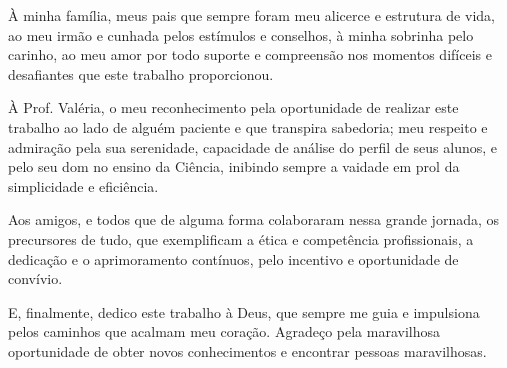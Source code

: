 
À minha família, meus pais que sempre foram meu alicerce e estrutura de vida, ao meu irmão e cunhada pelos estímulos e conselhos, à minha sobrinha pelo carinho, ao meu amor por todo suporte e compreensão nos momentos difíceis e desafiantes que este trabalho proporcionou.

À Prof. Valéria, o meu reconhecimento pela oportunidade de realizar este trabalho ao lado de alguém paciente e que transpira sabedoria; meu respeito e admiração pela sua serenidade, capacidade de análise do perfil de seus alunos, e pelo seu dom no ensino da Ciência, inibindo sempre a vaidade em prol da simplicidade e eficiência.

Aos amigos, e todos que de alguma forma colaboraram nessa grande jornada, os precursores de tudo, que exemplificam a ética e competência profissionais, a dedicação e o aprimoramento contínuos, pelo incentivo e oportunidade de convívio.

E, finalmente, dedico este trabalho à Deus, que sempre me guia e impulsiona pelos caminhos que acalmam meu coração. Agradeço pela maravilhosa oportunidade de obter novos conhecimentos e encontrar pessoas maravilhosas.